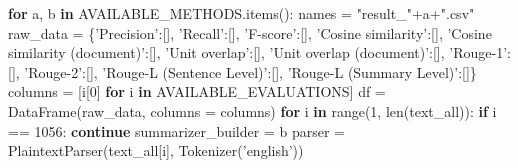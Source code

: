 \documentclass[11pt]{article}
\newenvironment{Shaded}{}{}
\newcommand{\KeywordTok}[1]{\textcolor[rgb]{0.00,0.44,0.13}{\textbf{{#1}}}}
\newcommand{\DecValTok}[1]{\textcolor[rgb]{0.25,0.63,0.44}{{#1}}}
\newcommand{\StringTok}[1]{\textcolor[rgb]{0.25,0.44,0.63}{{#1}}}
\newcommand{\NormalTok}[1]{{#1}}
\newcommand{\ControlFlowTok}[1]{\textcolor[rgb]{0.00,0.44,0.13}{\textbf{{#1}}}}
\newcommand{\OperatorTok}[1]{\textcolor[rgb]{0.40,0.40,0.40}{{#1}}}
\newcommand{\BuiltInTok}[1]{{#1}}
\begin{document}
    \begin{Shaded}
\begin{Highlighting}[]
\ControlFlowTok{for}\NormalTok{ a, b }\KeywordTok{in}\NormalTok{ AVAILABLE_METHODS.items():}
\NormalTok{    names }\OperatorTok{=} \StringTok{"result_"}\OperatorTok{+}\NormalTok{a}\OperatorTok{+}\StringTok{".csv"}
\NormalTok{    raw_data }\OperatorTok{=}\NormalTok{ \{}\StringTok{'Precision'}\NormalTok{:[], }\StringTok{'Recall'}\NormalTok{:[], }\StringTok{'F-score'}\NormalTok{:[], }\StringTok{'Cosine similarity'}\NormalTok{:[], }\StringTok{'Cosine similarity (document)'}\NormalTok{:[], }\StringTok{'Unit overlap'}\NormalTok{:[], }\StringTok{'Unit overlap (document)'}\NormalTok{:[], }\StringTok{'Rouge-1'}\NormalTok{:[], }\StringTok{'Rouge-2'}\NormalTok{:[], }\StringTok{'Rouge-L (Sentence Level)'}\NormalTok{:[], }\StringTok{'Rouge-L (Summary Level)'}\NormalTok{:[]\}}
\NormalTok{    columns }\OperatorTok{=}\NormalTok{ [i[}\DecValTok{0}\NormalTok{] }\ControlFlowTok{for}\NormalTok{ i }\KeywordTok{in}\NormalTok{ AVAILABLE_EVALUATIONS]}
\NormalTok{    df }\OperatorTok{=}\NormalTok{ DataFrame(raw_data, columns }\OperatorTok{=}\NormalTok{ columns)}
    \ControlFlowTok{for}\NormalTok{ i }\KeywordTok{in} \BuiltInTok{range}\NormalTok{(}\DecValTok{1}\NormalTok{, }\BuiltInTok{len}\NormalTok{(text_all)):}
        \ControlFlowTok{if}\NormalTok{ i }\OperatorTok{==} \DecValTok{1056}\NormalTok{: }\ControlFlowTok{continue}
\NormalTok{        summarizer_builder }\OperatorTok{=}\NormalTok{ b}
\NormalTok{        parser }\OperatorTok{=}\NormalTok{ PlaintextParser(text_all[i], Tokenizer(}\StringTok{'english'}\NormalTok{))}


\end{Highlighting}
\end{Shaded}
\end{document}
